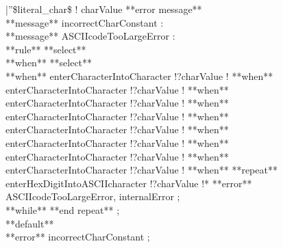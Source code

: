 |''\$literal\_char\$ ! charValue **error message** %
\\ 
**message** incorrectCharConstant : %
\\ 
**message** ASCIIcodeTooLargeError : %
\\ 
**rule** %
 **select**\\ 
 **when** %
  **select**\\ 
  **when** %
   enterCharacterIntoCharacter !?charValue !%
  **when** %
   enterCharacterIntoCharacter !?charValue !%
  **when** %
   enterCharacterIntoCharacter !?charValue !%
  **when** %
   enterCharacterIntoCharacter !?charValue !%
  **when** %
   enterCharacterIntoCharacter !?charValue !%
  **when** %
   enterCharacterIntoCharacter !?charValue !%
  **when** %
   enterCharacterIntoCharacter !?charValue !%
  **when** %
   enterCharacterIntoCharacter !?charValue !%
  **when** %
   **repeat**\\ 
    enterHexDigitIntoASCIIcharacter !?charValue !* **error** ASCIIcodeTooLargeError, internalError ;\\ 
   **while** %
   **end repeat** ;\\ 
  **default**\\ 
   **error** incorrectCharConstant ;\\ 
